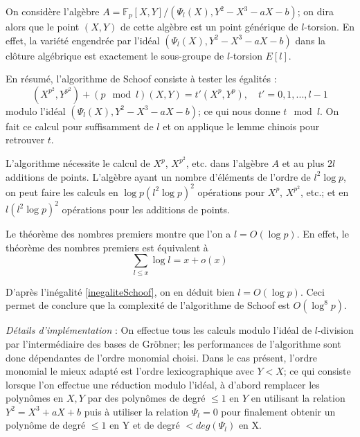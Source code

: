 \documentclass[a4paper]{article}
\theoremstyle{definition}
\theoremstyle{remark}
\numberwithin{equation}{section}
\begin{document}
On considère l'algèbre $A=\mathbb{F}_p[X,Y]/(\Psi_l(X),Y^2-X^3-aX-b)$; on dira alors que le point $(X,Y)$ de cette algèbre est un point générique de $l$-torsion. En effet, la variété engendrée par l'idéal $(\Psi_l(X),Y^2-X^3-aX-b)$ dans la clôture algébrique est exactement le sous-groupe de $l$-torsion $E[l]$.

En résumé, l'algorithme de Schoof consiste à tester les égalités :
\begin{equation}
\label{polCarFrob}
(X^{p^2},Y^{p^2}) + (p \mod l)(X,Y) = t'(X^p,Y^p), \quad t' = 0,1,...,l-1
\end{equation}
modulo l'idéal $(\Psi_l(X),Y^2-X^3-aX-b)$; ce qui nous donne $t \mod l$. On fait ce calcul pour suffisamment de $l$ et on applique le lemme chinois pour retrouver $t$.

L'algorithme nécessite le calcul de $X^p$, $X^{p^2}$, etc. dans l'algèbre $A$ et au plus $2l$ additions de points. L'algèbre ayant un nombre d'éléments de l'ordre de $l^2\log p$, on peut faire les calculs en $\log p(l^2\log p)^2$ opérations pour $X^p$, $X^{p^2}$, etc.; et en $l(l^2\log p)^2$ opérations pour les additions de points.

Le théorème des nombres premiers montre que l'on a $l = O(\log p)$. En effet, le théorème des nombres premiers est équivalent à
$$\sum_{l \leq x}\log l = x + o(x)$$

D'après l'inégalité \ref{inegaliteSchoof}, on en déduit bien $l = O(\log p)$. Ceci permet de conclure que la complexité de l'algorithme de Schoof est $O(\log^8 p)$.

\emph{Détails d'implémentation} : On effectue tous les calculs modulo l'idéal de $l$-division par l'intermédiaire des bases de Gröbner; les performances de l'algorithme sont donc dépendantes de l'ordre monomial choisi. Dans le cas présent, l'ordre monomial le mieux adapté est l'ordre lexicographique avec $Y < X$; ce qui consiste lorsque l'on effectue une réduction modulo l'idéal, à d'abord remplacer les polynômes en $X,Y$ par des polynômes de degré $\leq 1$ en $Y$ en utilisant la relation $Y^2 = X^3 + aX + b$ puis à utiliser la relation $\Psi_l=0$ pour finalement obtenir un polynôme de degré $\leq 1$ en Y et de degré $< deg(\Psi_l)$ en X.
\end{document}
